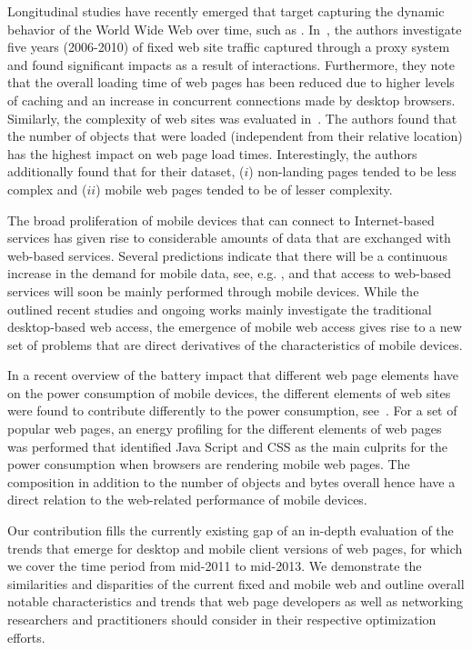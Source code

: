 \documentclass[onecolumn,12pt]{IEEEtran}
\begin{document}
Longitudinal studies have recently emerged that target capturing the dynamic behavior of the World Wide Web over time, such as \cite{CaAlPa10}.
In~\cite{IhPa11}, the authors investigate five years (2006-2010) of fixed web site traffic captured through a proxy system and found significant impacts as a result of interactions.
Furthermore, they note that the overall loading time of web pages has been reduced due to higher levels of caching and an increase in concurrent connections made by desktop browsers.
Similarly, the complexity of web sites was evaluated in~\cite{BuMaSe11,BuMaSe13}. The authors found that the number of objects that were loaded (independent from their relative location) has the highest impact on web page load times.
Interestingly, the authors additionally found that for their dataset, ($i$) non-landing pages tended to be less complex and ($ii$) mobile web pages tended to be of lesser complexity.


The broad proliferation of mobile devices that can connect to Internet-based services has given rise to considerable amounts of data that are exchanged with web-based services. 
Several predictions indicate that there will be a continuous increase in the demand for mobile data, see, e.g. \cite{Ci13}, and that access to web-based services will soon be mainly performed through mobile devices.
While the outlined recent studies and ongoing works mainly investigate the traditional desktop-based web access, the emergence of mobile web access gives rise to a new set of problems that are direct derivatives of the characteristics of mobile devices.

In a recent overview of the battery impact that different web page elements have on the power consumption of mobile  devices, the different elements of web sites were found to contribute differently to the power consumption, see~\cite{ThAgNiBoSi12}.
For a set of popular web pages, an energy profiling for the different elements of web pages was performed that identified Java Script and CSS as the main culprits for the power consumption when browsers are rendering mobile web pages.
The composition in addition to the number of objects and bytes overall hence have a direct relation to the web-related performance of mobile devices.

Our contribution fills the currently existing gap of an in-depth evaluation of the trends that emerge for desktop and mobile client versions of web pages, for which we cover the time period from mid-2011 to mid-2013.
We demonstrate the similarities and disparities of the current fixed and mobile web and outline overall notable characteristics and trends that web page developers as well as networking researchers and practitioners should consider in their respective optimization efforts.
\end{document}
